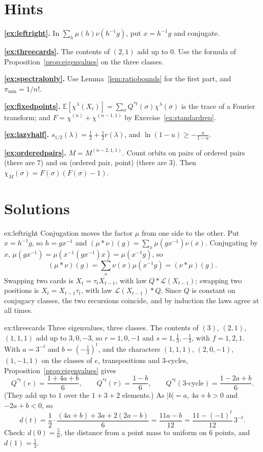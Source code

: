 \section{Hints}

\noindent\textbf{\ref{ex:leftright}.} In $\sum_h\mu(h)\nu(h^{-1}g)$, put $x=h^{-1}g$ and conjugate.

\noindent\textbf{\ref{ex:threecards}.} The contents of $(2,1)$ add up to $0$. Use the formula of Proposition~\ref{prop:eigenvalues} on the three classes.

\noindent\textbf{\ref{ex:spectralonly}.} Use Lemma~\ref{lem:ratiobounds} for the first part, and $\pi_{\min}=1/n!$.

\noindent\textbf{\ref{ex:fixedpoints}.} $\mathbb E[\chi^\lambda(X_t)]=\sum_\sigma Q^{*t}(\sigma)\chi^\lambda(\sigma)$ is the trace of a Fourier transform; and $F=\chi^{(n)}+\chi^{(n-1,1)}$ by Exercise~\ref{ex:standardrep}.

\noindent\textbf{\ref{ex:lazyhalf}.} $s_{1/2}(\lambda)=\frac12+\frac12r(\lambda)$, and $\ln(1-u)\ge-\frac u{1-u}$.

\noindent\textbf{\ref{ex:orderedpairs}.} $M=M^{(n-2,1,1)}$. Count orbits on pairs of ordered pairs (there are $7$) and on (ordered pair, point) (there are $3$). Then $\chi_M(\sigma)=F(\sigma)(F(\sigma)-1)$.

\section{Solutions}

\begin{solution}{ex:leftright}
\idea Conjugation moves the factor $\mu$ from one side to the other.
\writeup Put $x=h^{-1}g$, so $h=gx^{-1}$ and $(\mu*\nu)(g)=\sum_x\mu(gx^{-1})\nu(x)$. Conjugating by $x$, $\mu(gx^{-1})=\mu(x^{-1}(gx^{-1})x)=\mu(x^{-1}g)$, so
\[
(\mu*\nu)(g)=\sum_x\nu(x)\mu(x^{-1}g)=(\nu*\mu)(g).
\] Swapping two cards is $X_{t}=\tau_tX_{t-1}$, with law $Q*\mathcal L(X_{t-1})$;
swapping two positions is $X_t=X_{t-1}\tau_t$, with law $\mathcal L(X_{t-1})*Q$. Since $Q$ is constant on conjugacy classes, the two recursions coincide, and by induction the laws agree at all times.
\end{solution}

\begin{solution}{ex:threecards}
\idea Three eigenvalues, three classes.
\writeup The contents of $(3)$, $(2,1)$, $(1,1,1)$ add up to $3,0,-3$, so $r=1,0,-1$ and $s=1,\frac13,-\frac13$, with $f=1,2,1$. With $a=3^{-t}$ and $b=(-\frac13)^t$, and the characters $(1,1,1)$, $(2,0,-1)$, $(1,-1,1)$ on the classes of $e$, transpositions and $3$-cycles, Proposition~\ref{prop:eigenvalues} gives
\[
Q^{*t}(e)=\frac{1+4a+b}6,\qquad Q^{*t}(\tau)=\frac{1-b}6,\qquad Q^{*t}(\text{3-cycle})=\frac{1-2a+b}6.
\]
(They add up to $1$ over the $1+3+2$ elements.) As $|b|=a$, $4a+b>0$ and $-2a+b<0$, so
\[
d(t)=\frac12\cdot\frac{(4a+b)+3a+2(2a-b)}6=\frac{11a-b}{12}=\frac{11-(-1)^t}{12}\,3^{-t}.
\]
Check: $d(0)=\frac56$, the distance from a point mass to uniform on $6$ points, and $d(1)=\frac13$.
\end{solution}

